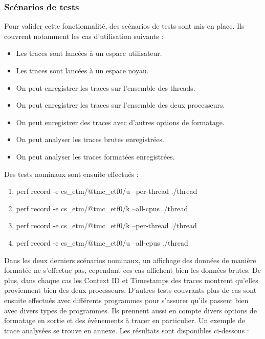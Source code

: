 \subsubsection{Scénarios de tests}
\label{sec:tests}

Pour valider cette fonctionnalité, des scénarios de tests sont mis en place.
Ils couvrent notamment les cas d'utilisation suivants :

\begin{itemize}[label=\textbullet]
	\item Les traces sont lancées à un espace utilisateur.
	\item Les traces sont lancées à un espace noyau.
	\item On peut enregistrer les traces sur l'ensemble des threads. 
	\item On peut enregistrer les traces sur l'ensemble des deux
		processeurs.
	\item On peut enregistrer des traces avec d'autres options de
		formatage.
	\item On peut analyser les traces brutes enregistrées.
	\item On peut analyser les traces formatées enregistrées.
\end{itemize}

Des tests nominaux sont ensuite effectués :

\begin{enumerate}
	\item perf record -e cs\_etm/@tmc\_etf0/u --per-thread ./thread
	\item perf record -e cs\_etm/@tmc\_etf0/k --all-cpus ./thread
	\item perf record -e cs\_etm/@tmc\_etf0/k --per-thread ./thread
	\item perf record -e cs\_etm/@tmc\_etf0/u --all-cpus ./thread 
\end{enumerate}

Dans les deux derniers scénarios nominaux, un affichage des données de manière
formatée ne s'effectue pas, cependant ces cas affichent bien les données
brutes. De plus, dans chaque cas les Context ID et Timestamps des traces
montrent qu'elles proviennent bien des deux processeurs. D'autres tests
couvrants plus de cas sont ensuite effectués avec différents programmes pour
s'assurer qu'ils passent bien avec divers types de programmes. Ils prennent
aussi en compte divers options de formatage en sortie et des évènements à
tracer en particulier. Un exemple de trace analysées se trouve en annexe. Les
résultats sont disponibles ci-dessous :


